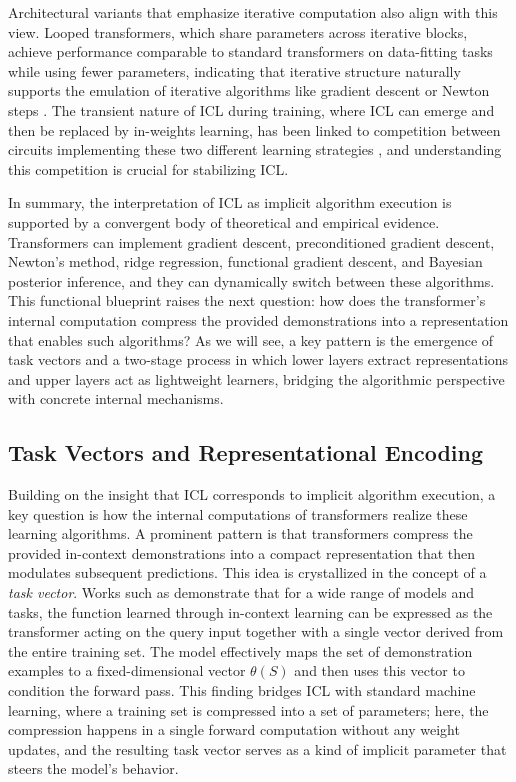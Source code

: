 \documentclass[11pt]{article}
\begin{document}
Architectural variants that emphasize iterative computation also align with this view. Looped transformers, which share parameters across iterative blocks, achieve performance comparable to standard transformers on data-fitting tasks while using fewer parameters, indicating that iterative structure naturally supports the emulation of iterative algorithms like gradient descent or Newton steps \cite{ref60}. The transient nature of ICL during training, where ICL can emerge and then be replaced by in-weights learning, has been linked to competition between circuits implementing these two different learning strategies \cite{ref53}, and understanding this competition is crucial for stabilizing ICL.

In summary, the interpretation of ICL as implicit algorithm execution is supported by a convergent body of theoretical and empirical evidence. Transformers can implement gradient descent, preconditioned gradient descent, Newton's method, ridge regression, functional gradient descent, and Bayesian posterior inference, and they can dynamically switch between these algorithms. This functional blueprint raises the next question: how does the transformer's internal computation compress the provided demonstrations into a representation that enables such algorithms? As we will see, a key pattern is the emergence of task vectors and a two-stage process in which lower layers extract representations and upper layers act as lightweight learners, bridging the algorithmic perspective with concrete internal mechanisms.

\subsection{Task Vectors and Representational Encoding}

Building on the insight that ICL corresponds to implicit algorithm execution, a key question is how the internal computations of transformers realize these learning algorithms. A prominent pattern is that transformers compress the provided in-context demonstrations into a compact representation that then modulates subsequent predictions. This idea is crystallized in the concept of a \emph{task vector}. Works such as \cite{ref61} demonstrate that for a wide range of models and tasks, the function learned through in-context learning can be expressed as the transformer acting on the query input together with a single vector derived from the entire training set. The model effectively maps the set of demonstration examples to a fixed-dimensional vector \(\theta(S)\) and then uses this vector to condition the forward pass. This finding bridges ICL with standard machine learning, where a training set is compressed into a set of parameters; here, the compression happens in a single forward computation without any weight updates, and the resulting task vector serves as a kind of implicit parameter that steers the model's behavior.
\end{document}
